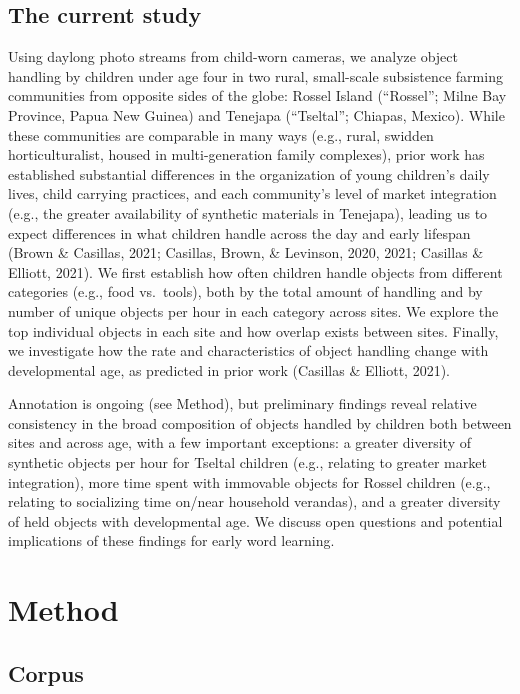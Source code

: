 \documentclass[10pt, letterpaper]{article}
\begin{document}
\hypertarget{the-current-study}{%
\subsection{The current study}\label{the-current-study}}

Using daylong photo streams from child-worn cameras, we analyze object
handling by children under age four in two rural, small-scale
subsistence farming communities from opposite sides of the globe: Rossel
Island (``Rossel''; Milne Bay Province, Papua New Guinea) and Tenejapa
(``Tseltal''; Chiapas, Mexico). While these communities are comparable
in many ways (e.g., rural, swidden horticulturalist, housed in
multi-generation family complexes), prior work has established
substantial differences in the organization of young children's daily
lives, child carrying practices, and each community's level of market
integration (e.g., the greater availability of synthetic materials in
Tenejapa), leading us to expect differences in what children handle
across the day and early lifespan (Brown \& Casillas, 2021; Casillas,
Brown, \& Levinson, 2020, 2021; Casillas \& Elliott, 2021). We first
establish how often children handle objects from different categories
(e.g., food vs.~tools), both by the total amount of handling and by
number of unique objects per hour in each category across sites. We
explore the top individual objects in each site and how overlap exists
between sites. Finally, we investigate how the rate and characteristics
of object handling change with developmental age, as predicted in prior
work (Casillas \& Elliott, 2021).

Annotation is ongoing (see Method), but preliminary findings reveal
relative consistency in the broad composition of objects handled by
children both between sites and across age, with a few important
exceptions: a greater diversity of synthetic objects per hour for
Tseltal children (e.g., relating to greater market integration), more
time spent with immovable objects for Rossel children (e.g., relating to
socializing time on/near household verandas), and a greater diversity of
held objects with developmental age. We discuss open questions and
potential implications of these findings for early word learning.

\hypertarget{method}{%
\section{Method}\label{method}}

\hypertarget{corpus}{%
\subsection{Corpus}\label{corpus}}
\end{document}
